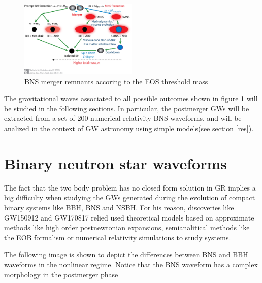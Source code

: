 \begin{figure}[hbt!]
\begin{center}
\includegraphics[width=0.5\textwidth, angle=0]{images/shi.jpeg}
\captionsetup{width=0.8\textwidth}
\caption{BNS merger remnants accoring to the EOS threshold mass}
\label{BNS-out}
\end{center}
\end{figure}
\FloatBarrier


The gravitational waves associated to all possible outcomes shown in figure \ref{BNS-out} will be studied in the following sections. In particular, the postmerger GWs will be extracted from a set of 200 numerical relativity BNS waveforms, and will be analized in the context of GW astronomy using simple models(see section \ref{res}).

\section{Binary neutron star waveforms}

The fact that the two body problem has no closed form solution in GR implies a big difficulty when studying the GWs generated during the evolution of compact binary systems like BBH, BNS and NSBH. For his reason, discoveries like GW150912 and GW170817 relied used theoretical models based on approximate methods like high order postnewtonian expansions, semianalitical methods like the  EOB formalism \cite{PhysRevD.96.121501,Dietrich:2018uni}  or numerical relativity simulations to study systems.


The following image is shown to depict the differences between BNS and BBH waveforms in the nonlinear regime. Notice that the BNS waveform has a complex morphology in the postmerger phase

